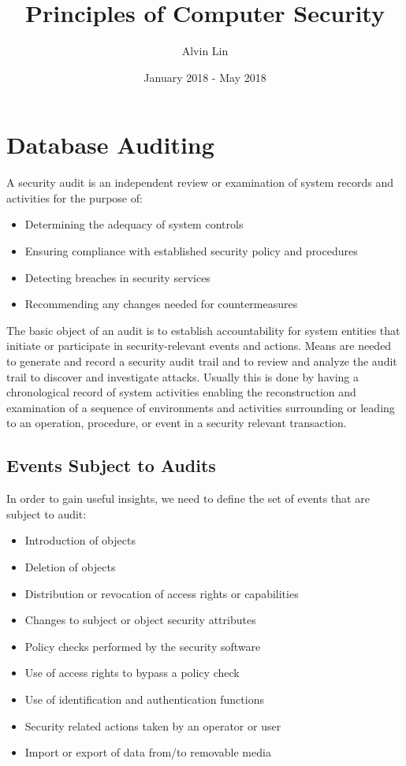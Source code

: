 \documentclass{math}
\title{Principles of Computer Security}
\author{Alvin Lin}
\date{January 2018 - May 2018}
\begin{document}
\maketitle

\section*{Database Auditing}
A security audit is an independent review or examination of system records and
activities for the purpose of:
\begin{itemize}
  \item Determining the adequacy of system controls
  \item Ensuring compliance with established security policy and procedures
  \item Detecting breaches in security services
  \item Recommending any changes needed for countermeasures
\end{itemize}
The basic object of an audit is to establish accountability for system entities
that initiate or participate in security-relevant events and actions. Means are
needed to generate and record a security audit trail and to review and analyze
the audit trail to discover and investigate attacks. Usually this is done by
having a chronological record of system activities enabling the reconstruction
and examination of a sequence of environments and activities surrounding
or leading to an operation, procedure, or event in a security relevant
transaction.

\subsection*{Events Subject to Audits}
In order to gain useful insights, we need to define the set of events that are
subject to audit:
\begin{itemize}
  \item Introduction of objects
  \item Deletion of objects
  \item Distribution or revocation of access rights or capabilities
  \item Changes to subject or object security attributes
  \item Policy checks performed by the security software
  \item Use of access rights to bypass a policy check
  \item Use of identification and authentication functions
  \item Security related actions taken by an operator or user
  \item Import or export of data from/to removable media
\end{itemize}
\end{document}
